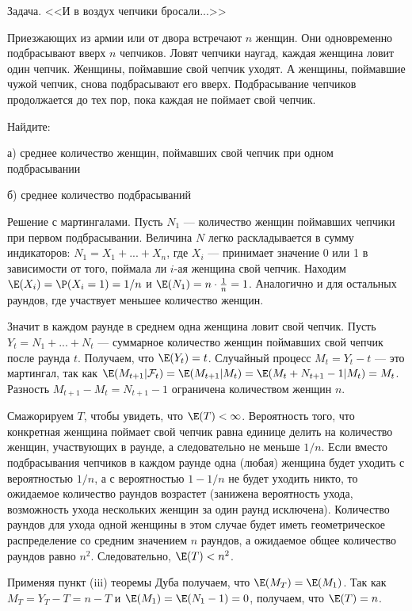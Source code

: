 Задача. <<И в воздух чепчики бросали...>> %

Приезжающих из армии или от двора встречают $n$ женщин. Они
одновременно подбрасывают вверх $n$ чепчиков. Ловят чепчики
наугад, каждая женщина ловит один чепчик.
Женщины, поймавшие свой чепчик уходят. А женщины,
поймавшие чужой чепчик, снова подбрасывают его вверх.
Подбрасывание чепчиков продолжается до тех пор, пока каждая не
поймает свой чепчик. 

Найдите:

а) среднее количество женщин, поймавших свой чепчик при одном подбрасывании

б) среднее количество подбрасываний 

Решение с мартингалами. Пусть $N_{1}$ --- количество женщин поймавших чепчики при первом подбрасывании. Величина $N$ легко раскладывается в сумму индикаторов: $N_{1}=X_{1}+...+X_{n}$, где $X_{i}$ --- принимает значение 0 или 1 в зависимости от того, поймала ли $i$-ая женщина свой чепчик. Находим $\E(X_{i})=\P(X_{i}=1)=1/n$ и $\E(N_{1})=n\cdot \frac{1}{n}=1$. Аналогично и для остальных раундов, где участвует меньшее количество женщин.

Значит в каждом раунде в среднем одна женщина ловит свой чепчик. Пусть $Y_{t}=N_{1}+...+N_{t}$ --- суммарное количество женщин поймавших свой чепчик после раунда $t$. Получаем, что $\E(Y_{t})=t$. Случайный процесс $M_{t}=Y_{t}-t$ --- это мартингал, так как $\E(M_{t+1}|\mathcal{F}_{t})=\E(M_{t+1}|M_{t})=\E(M_{t}+N_{t+1}-1|M_{t})=M_{t}$. Разность $M_{t+1}-M_{t}=N_{t+1}-1$ ограничена количеством женщин $n$.

Смажорируем $T$, чтобы увидеть, что $\E(T)<\infty$. Вероятность того, что конкретная женщина поймает свой чепчик равна единице делить на количество женщин, участвующих в раунде, а следовательно не меньше $1/n$. Если вместо подбрасывания чепчиков в каждом раунде одна (любая) женщина будет уходить с вероятностью $1/n$, а с вероятностью $1-1/n$ не будет уходить никто, то ожидаемое количество раундов возрастет (занижена вероятность ухода, возможность ухода нескольких женщин за один раунд исключена). Количество раундов для ухода одной женщины в этом случае будет иметь геометрическое распределение со средним значением $n$ раундов, а ожидаемое общее количество раундов равно $n^{2}$. Следовательно, $\E(T)<n^{2}$.

Применяя пункт (iii) теоремы Дуба получаем, что $\E(M_{T})=\E(M_{1})$. Так как $M_{T}=Y_{T}-T=n-T$ и $\E(M_{1})=\E(N_{1}-1)=0$, получаем, что $\E(T)=n$.

